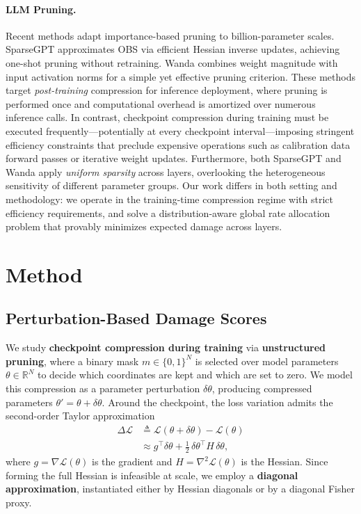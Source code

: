 ﻿\documentclass[11pt]{article}
\begin{document}
\paragraph{LLM Pruning.}
Recent methods adapt importance-based pruning to billion-parameter scales.
SparseGPT \citep{sparsegpt} approximates OBS via efficient Hessian inverse updates, achieving one-shot pruning without retraining.
Wanda \citep{wanda} combines weight magnitude with input activation norms for a simple yet effective pruning criterion.
These methods target \emph{post-training} compression for inference deployment, where pruning is performed once and computational overhead is amortized over numerous inference calls.
In contrast, checkpoint compression during training must be executed frequently---potentially at every checkpoint interval---imposing stringent efficiency constraints that preclude expensive operations such as calibration data forward passes or iterative weight updates.
Furthermore, both SparseGPT and Wanda apply \emph{uniform sparsity} across layers, overlooking the heterogeneous sensitivity of different parameter groups.
Our work differs in both setting and methodology: we operate in the training-time compression regime with strict efficiency requirements, and solve a distribution-aware global rate allocation problem that provably minimizes expected damage across layers.

\section{Method}

\subsection{Perturbation-Based Damage Scores}

We study \textbf{checkpoint compression during training} via \textbf{unstructured pruning}, where a binary mask $m\in\{0,1\}^N$ is selected over model parameters $\theta\in\mathbb{R}^N$ to decide which coordinates are kept and which are set to zero. We model this compression as a parameter perturbation $\delta\theta$, producing compressed parameters $\theta'=\theta+\delta\theta$. Around the checkpoint, the loss variation admits the second-order Taylor approximation
\begin{equation}
\begin{aligned}
\Delta\mathcal{L}
&\triangleq
\mathcal{L}(\theta+\delta\theta)-\mathcal{L}(\theta) \\
&\approx
g^\top \delta\theta
+ \frac{1}{2}\,\delta\theta^\top H\,\delta\theta,
\end{aligned}
\end{equation}
where $g=\nabla\mathcal{L}(\theta)$ is the gradient and $H=\nabla^2\mathcal{L}(\theta)$ is the Hessian. Since forming the full Hessian is infeasible at scale, we employ a \textbf{diagonal approximation}, instantiated either by Hessian diagonals or by a diagonal Fisher proxy.
\end{document}
